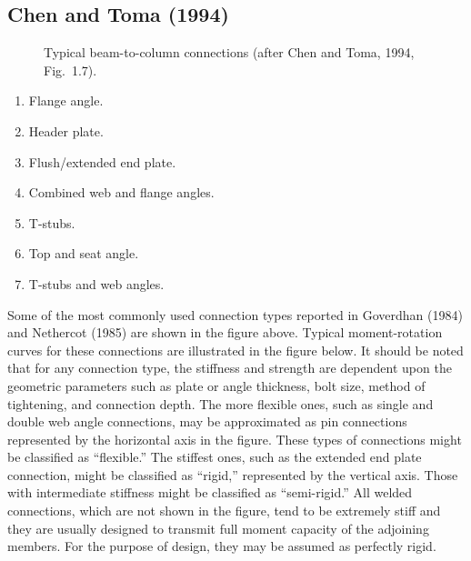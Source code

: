 \subsection*{Chen and Toma (1994)}
\begin{figure}[H]
  \centering
  
  \caption{Typical beam-to-column connections (after Chen and Toma, 1994, Fig.~1.7).}
\end{figure}
\begin{enumerate}[label=(\arabic*),start=4]
  \item Flange angle.
  \item Header plate.
  \item Flush/extended end plate.
  \item Combined web and flange angles.
  \item T-stubs.
  \item Top and seat angle.
  \item T-stubs and web angles.
\end{enumerate}
Some of the most commonly used connection types reported in Goverdhan (1984) and Nethercot (1985) are shown in the figure above. Typical moment-rotation curves for these connections are illustrated in the figure below. It should be noted that for any connection type, the stiffness and strength are dependent upon the geometric parameters such as plate or angle thickness, bolt size, method of tightening, and connection depth. The more flexible ones, such as single and double web angle connections, may be approximated as pin connections represented by the horizontal axis in the figure. These types of connections might be classified as ``flexible.'' The stiffest ones, such as the extended end plate connection, might be classified as ``rigid,'' represented by the vertical axis. Those with intermediate stiffness might be classified as ``semi-rigid.'' All welded connections, which are not shown in the figure, tend to be extremely stiff and they are usually designed to transmit full moment capacity of the adjoining members. For the purpose of design, they may be assumed as perfectly rigid.


